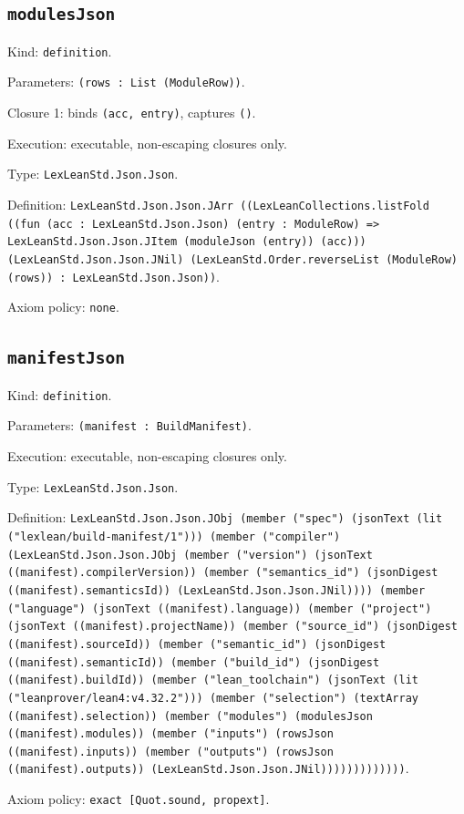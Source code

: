 \documentclass[11pt]{article}
\begin{document}
\subsection*{\texttt{modulesJson}}
\noindent Kind: \texttt{definition}.\par
\noindent Parameters: \texttt{(rows : List (ModuleRow))}.\par
\noindent Closure 1: binds \texttt{(acc, entry)}, captures \texttt{()}.\par
\noindent Execution: executable, non-escaping closures only.\par
\noindent Type: \texttt{LexLeanStd.Json.Json}.\par
\noindent Definition: \texttt{LexLeanStd.Json.Json.JArr ((LexLeanCollections.listFold ((fun (acc : LexLeanStd.Json.Json) (entry : ModuleRow) => LexLeanStd.Json.Json.JItem (moduleJson (entry)) (acc))) (LexLeanStd.Json.Json.JNil) (LexLeanStd.Order.reverseList (ModuleRow) (rows)) : LexLeanStd.Json.Json))}.\par
\noindent Axiom policy: \texttt{none}.\par
\subsection*{\texttt{manifestJson}}
\noindent Kind: \texttt{definition}.\par
\noindent Parameters: \texttt{(manifest : BuildManifest)}.\par
\noindent Execution: executable, non-escaping closures only.\par
\noindent Type: \texttt{LexLeanStd.Json.Json}.\par
\noindent Definition: \texttt{LexLeanStd.Json.Json.JObj (member ("spec") (jsonText (lit ("lexlean/build-manifest/1"))) (member ("compiler") (LexLeanStd.Json.Json.JObj (member ("version") (jsonText ((manifest).compilerVersion)) (member ("semantics\_id") (jsonDigest ((manifest).semanticsId)) (LexLeanStd.Json.Json.JNil)))) (member ("language") (jsonText ((manifest).language)) (member ("project") (jsonText ((manifest).projectName)) (member ("source\_id") (jsonDigest ((manifest).sourceId)) (member ("semantic\_id") (jsonDigest ((manifest).semanticId)) (member ("build\_id") (jsonDigest ((manifest).buildId)) (member ("lean\_toolchain") (jsonText (lit ("leanprover/lean4:v4.32.2"))) (member ("selection") (textArray ((manifest).selection)) (member ("modules") (modulesJson ((manifest).modules)) (member ("inputs") (rowsJson ((manifest).inputs)) (member ("outputs") (rowsJson ((manifest).outputs)) (LexLeanStd.Json.Json.JNil)))))))))))))}.\par
\noindent Axiom policy: \texttt{exact [Quot.sound, propext]}.\par
\end{document}

